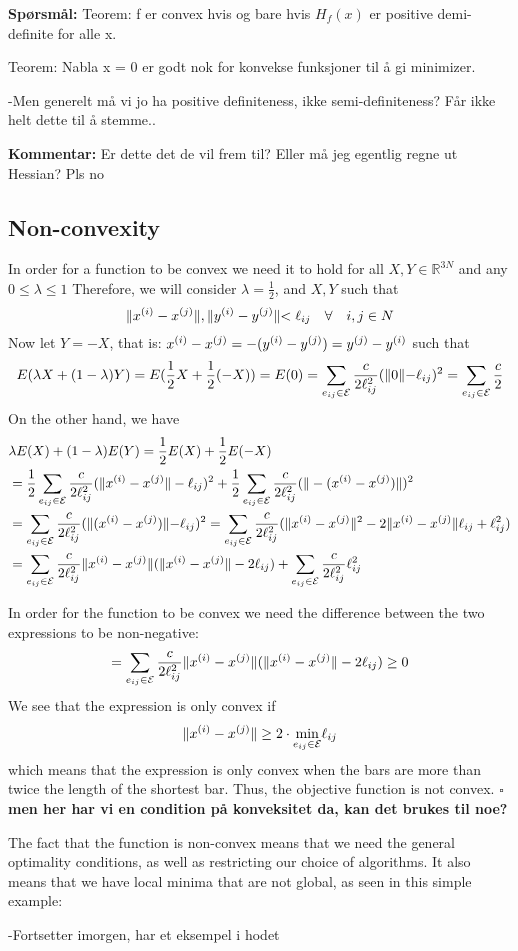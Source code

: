\textbf{Spørsmål:} 
Teorem: 
f er convex hvis og bare hvis $H_f(x)$ er positive demi-definite for alle x.

Teorem: Nabla x = 0 er godt nok for konvekse funksjoner til å gi minimizer. 

-Men generelt må vi jo ha positive definiteness, ikke semi-definiteness? Får ikke helt dette til å stemme..

\textbf{Kommentar:} Er dette det de vil frem til? Eller må jeg egentlig regne ut Hessian? Pls no

\subsection{Non-convexity}
In order for a function to be convex we need it to hold for all $X,Y \in \mathbb{R}^{3N}$ and any $0\leq \lambda \leq 1$ Therefore, we will consider $\lambda = \frac{1}{2}$, and $X,Y$ such that 
\begin{equation*}
    \rVert x^{(i)}-x^{(j)} \lVert, \rVert y^{(i)}-y^{(j)} \lVert < \ell_{ij} \quad \forall \quad i,j \in N
\end{equation*}
Now let $Y = -X$, that is: $x^{(i)}-x^{(j)} = -(y^{(i)}-y^{(j)}) = y^{(j)}-y^{(i)}$ such that
\begin{equation}
    \label{energyConv1}
    E(\lambda X + (1-\lambda) Y) = E(\frac{1}{2}X + \frac{1}{2}(-X)) = E(0) = \sum\limits_{e_{ij} \in \mathcal{E}} \frac{c}{2 \ell_{ij}^2} ( \rVert 0 \lVert - \ell_{ij})^2 = \sum\limits_{e_{ij} \in \mathcal{E}}\frac{c}{2}
\end{equation}
On the other hand, we have
\begin{equation}
\label{energyConv2}
\begin{aligned}    
    &\lambda E(X) + (1-\lambda)E(Y) = \frac{1}{2}E(X) + \frac{1}{2}E(-X) \\& 
    = \frac{1}{2}\sum\limits_{e_{ij} \in \mathcal{E}} \frac{c}{2\ell_{ij}^2} (\lVert x^{(i)} - x^{(j)}\rVert - \ell_{ij})^2 + \frac{1}{2} \sum\limits_{e_{ij} \in \mathcal{E}}\frac{c}{2\ell_{ij}^2} (\rVert-(x^{(i)}-x^{(j)})\lVert)^2\\
    &= \sum\limits_{e_{ij} \in \mathcal{E}}\frac{c}{2\ell_{ij}^2}(\rVert(x^{(i)}-x^{(j)})\lVert - \ell_{ij} )^2= \sum\limits_{e_{ij} \in \mathcal{E}}\frac{c}{2\ell_{ij}^2} (\lVert x^{(i)} - x^{(j)}\rVert^2 - 2\lVert x^{(i)} - x^{(j)}\rVert \ell_{ij} + \ell_{ij}^2) \\
    &=\sum\limits_{e_{ij} \in \mathcal{E}}\frac{c}{2\ell_{ij}^2} \lVert x^{(i)} - x^{(j)}\rVert (\lVert x^{(i)} - x^{(j)}\rVert - 2 \ell_{ij}) + \sum\limits_{e_{ij} \in \mathcal{E}}\frac{c}{2\ell_{ij}^2}\ell_{ij}^2
    \end{aligned}
\end{equation}

In order for the function to be convex we need the difference between the two expressions to be non-negative:
\begin{equation}
    =\sum\limits_{e_{ij} \in \mathcal{E}}\frac{c}{2\ell_{ij}^2} \lVert x^{(i)} - x^{(j)}\rVert (\lVert x^{(i)} - x^{(j)}\rVert - 2 \ell_{ij}) \geq 0
\end{equation}
We see that the expression is only convex if 
$$\lVert x^{(i)} - x^{(j)}\rVert \geq 2 \cdot \underset{{e_{ij} \in \mathcal{E}}}{\text{min}}\ell_{ij}$$
which means that the expression is only convex when the bars are more than twice the length of the shortest bar. Thus, the objective function is not convex. $\square$
\textbf{men her har vi en condition på konveksitet da, kan det brukes til noe?}

The fact that the function is non-convex means that we need the general optimality conditions, as well as restricting our choice of algorithms. It also means that we have local minima that are not global, as seen in this simple example:

-Fortsetter imorgen, har et eksempel i hodet